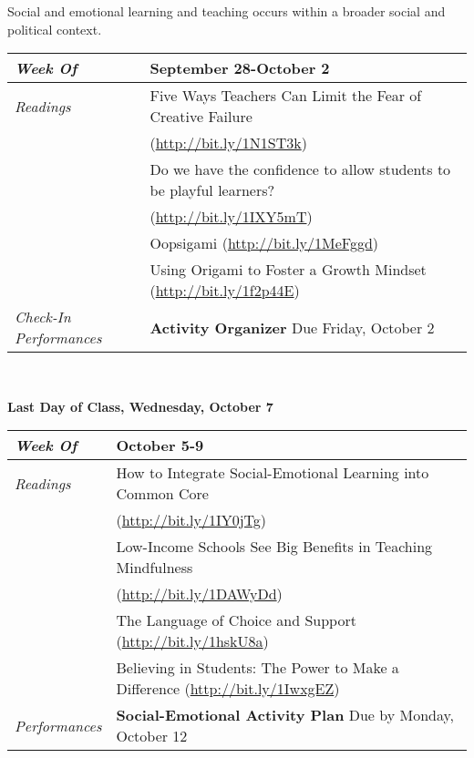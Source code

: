 \documentclass{article}
\newcommand{\gentopic}[1]{\begin{center}\faKey \textsf{#1}\end{center}}
\newcommand{\tabread}{\faBook\medspace\textit{Readings}}
\newcommand{\tabperformance}{\faTasks\medspace\textit{Performances}}
\newcommand{\tabdt}{\faCalendar\medspace\textit{Week Of}}
\newcommand{\tabcheckin}{\faCheckSquareO\medspace\textit{Check-In Performances}}
\newcommand{\tabbreak}{\begin{center}\faAsterisk\faAsterisk\faAsterisk\\\end{center}}
\newenvironment{tabsched}
	{\small
	\begin{tabular}{p{1.5in}p{4.5in}}
	\midrule}
	{\midrule
	\end{tabular}
	\normalsize}
\newcommand{\weekseven}{September 28-October 2}
\newcommand{\weekeight}{October 5-9}
\newcommand{\finisemester}{\begin{center}\large\textbf{\faFlagCheckered Last Day of Class, Wednesday, October 7 \faFlagCheckered}\normalsize\end{center}}
\begin{document}
\gentopic{Social and emotional learning and teaching occurs within a broader social and political context.}

\begin{tabsched}
	\tabdt & \weekseven \\
	\midrule
	\tabread & Five Ways Teachers Can Limit the Fear of Creative Failure \\
	& (\url{http://bit.ly/1N1ST3k}) \\
	& Do we have the confidence to allow students to be playful learners? \\
	& (\url{http://bit.ly/1IXY5mT}) \\
	& Oopsigami (\url{http://bit.ly/1MeFggd}) \\
	& Using Origami to Foster a Growth Mindset (\url{http://bit.ly/1f2p44E}) \\
	\midrule
	\tabcheckin & \textbf{Activity Organizer} Due Friday, October 2 \\
\end{tabsched}

\tabbreak

\finisemester

\begin{tabsched}
	\tabdt & \weekeight \\
	\midrule
	\tabread & How to Integrate Social-Emotional Learning into Common Core \\
	& (\url{http://bit.ly/1IY0jTg}) \\
	& Low-Income Schools See Big Benefits in Teaching Mindfulness \\
	& (\url{http://bit.ly/1DAWyDd}) \\
	& The Language of Choice and Support (\url{http://bit.ly/1hskU8a}) \\
	& Believing in Students: The Power to Make a Difference (\url{http://bit.ly/1IwxgEZ}) \\
	\midrule
	\tabperformance & \textbf{Social-Emotional Activity Plan} Due by Monday, October 12 \\
\end{tabsched}
\end{document}
